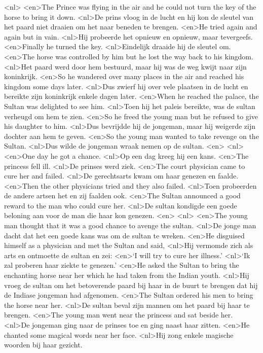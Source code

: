 <nl>
<en>The Prince was flying in the air and he could not turn the key of the horse to bring it down.
<nl>De prins vloog in de lucht en hij kon de sleutel van het paard niet draaien om het naar beneden te brengen.
<en>He tried again and again but in vain.
<nl>Hij probeerde het opnieuw en opnieuw, maar tevergeefs.
<en>Finally he turned the key.
<nl>Eindelijk draaide hij de sleutel om.
<en>The horse was controlled by him but he lost the way back to his kingdom.
<nl>Het paard werd door hem bestuurd, maar hij was de weg kwijt naar zijn koninkrijk.
<en>So he wandered over many places in the air and reached his kingdom some days later.
<nl>Dus zwierf hij over vele plaatsen in de lucht en bereikte  zijn koninkrijk enkele dagen later.
<en>When he reached the palace, the Sultan was delighted to see him.
<nl>Toen hij het paleis bereikte, was de sultan verheugd om hem te zien.
<en>So he freed the young man but he refused to give his daughter to him.
<nl>Dus bevrijdde hij de jongeman, maar hij weigerde zijn dochter aan hem te geven.
<en>So the young man wanted to take revenge on the Sultan.
<nl>Dus wilde de jongeman wraak nemen op de sultan.
<en>
<nl>
<en>One day he got a chance.
<nl>Op een dag kreeg hij een kans.
<en>The princess fell ill.
<nl>De prinses werd ziek.
<en>The court physician came to cure her and failed.
<nl>De gerechtsarts kwam om haar genezen en faalde.
<en>Then the other physicians tried and they also failed.
<nl>Toen probeerden de andere artsen het en zij faalden ook.
<en>The Sultan announced a good reward to the man who could cure her.
<nl>De sultan kondigde een goede beloning aan voor de man die haar kon genezen.
<en>
<nl>
<en>The young man thought that it was a good chance to avenge the sultan.
<nl>De jonge man dacht dat het een goede kans was om de sultan te wreken.
<en>He disguised himself as a physician and met the Sultan and said, 
<nl>Hij vermomde zich als arts en ontmoette de sultan en zei:
<en>`I will try to cure her illness.'
<nl>`Ik zal proberen haar ziekte te genezen.'
<en>He asked the Sultan to bring the enchanting horse near her which he had taken from the Indian youth.
<nl>Hij vroeg de sultan om het betoverende paard bij haar in de buurt te brengen dat hij de Indiase jongeman had afgenomen.
<en>The Sultan ordered his men to bring the horse near her.
<nl>De sultan beval zijn mannen om het paard bij haar te brengen.
<en>The young man went near the princess and sat beside her.
<nl>De jongeman ging naar de prinses toe en ging naast haar zitten.
<en>He chanted some magical words near her face.
<nl>Hij zong enkele magische woorden bij haar gezicht.
